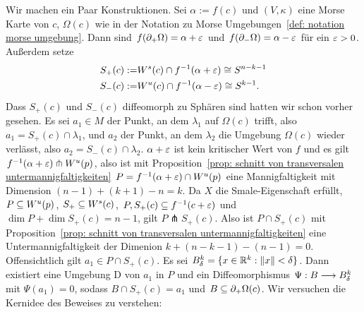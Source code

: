 \begin{bigproof}
    Wir machen ein Paar Konstruktionen. Sei $\alpha := f(c)$ und $(V, \kappa)$ eine Morse Karte von
    $c$, $\Omega(c)$ wie in der Notation zu Morse Umgebungen~\ref{def: notation morse umgebung}. 
    Dann sind $f({ \partial }_+ \Omega) = \alpha + \varepsilon$ und $f({ \partial }_- \Omega) = \alpha - \varepsilon$ für ein 
    $\varepsilon > 0$. Außerdem setze
    \begin{align*}
        S_+ (c) := & { W^s } (c) \cap f^{-1}(\alpha + \varepsilon) \cong S^{n - k - 1} \\
        S_- (c) := & { W^u } (c) \cap f^{-1}(\alpha - \varepsilon) \cong S^{k - 1} .
    \end{align*}
    Dass $S_+ (c)$ und $S_- (c)$ diffeomorph zu Sphären sind hatten wir schon vorher gesehen.
    Es sei $a_1 \in M$ der Punkt, an dem $\lambda_1$ auf $\Omega(c)$ trifft, also 
    $a_1 = S_+ (c) \cap \lambda_1$, und $a_2$ der Punkt, an dem $\lambda_2$ die Umgebung $\Omega (c)$ 
    wieder verlässt, also $a_2 = S_- (c) \cap \lambda_2$. $\alpha + \varepsilon$ ist kein kritischer Wert 
    von $f$ und es gilt $f^{-1}(\alpha + \varepsilon) \pitchfork { W^u } (p)$, also ist mit 
    Proposition~\ref{prop: schnitt von transversalen untermannigfaltigkeiten} 
    $P = f^{-1}(\alpha + \varepsilon) \cap { W^u } (p)$ eine Mannigfaltigkeit mit Dimension 
    $(n - 1) + (k + 1) - n = k$. Da $X$ die Smale-Eigenschaft erfüllt, $P \subseteq { W^u } (p)$,
    $S_+ \subseteq { W^s }(c)$, $P, S_+(c) \subseteq f^{-1}(c + \varepsilon)$ und 
    $\dim P + \dim S_+(c) = n - 1$, gilt $P \pitchfork S_+ (c)$. Also ist $P \cap S_+ (c)$
    mit Proposition~\ref{prop: schnitt von transversalen untermannigfaltigkeiten} eine 
    Untermannigfaltigkeit der Dimenion $k + (n - k - 1) - (n - 1) = 0$. Offensichtlich gilt 
    $a_1 \in P \cap S_+ (c)$. Es sei $B^k_{\delta} = \{ x \in { \mathbb R }^k : \| x \| < \delta \}$. Dann 
    existiert eine Umgebung D von $a_1$ in $P$ und ein Diffeomorphismus 
    $\Psi : B \longrightarrow B^k_{\delta}$ mit $\Psi(a_1) = 0$, sodass $B \cap S_+ (c) = a_1$ 
    und $B \subseteq { \partial }_+ \Omega (c)$. Wir versuchen die Kernidee des Beweises zu verstehen:

    \begin{figure}
        \centering
\end{figure}
\end{bigproof}
